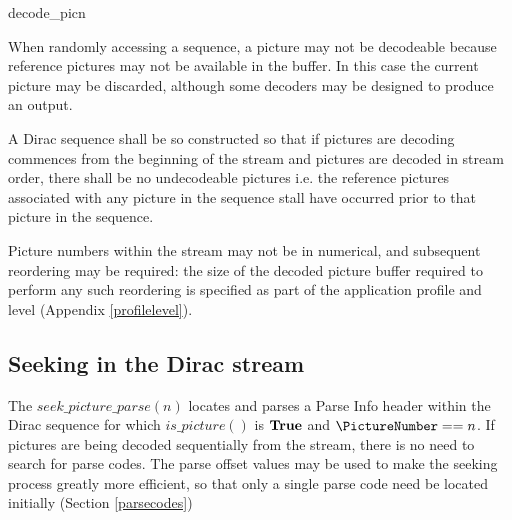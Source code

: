 \begin{pseudo}{decode\_pic}{n}
\bsIF{\ZeroResidual==\false}
\bsEND
{}
    \bsEND
\bsEND
{}
\bsEND
{}
\end{pseudo}

When randomly accessing a sequence, a picture may not be decodeable because reference pictures
may not be available in the buffer. In this case the current picture may be discarded, although some
decoders may be designed to produce an output. 

A Dirac sequence shall be so constructed so that if
pictures are decoding commences from the beginning of the stream and pictures are decoded in 
stream order, there shall be no undecodeable pictures i.e. the reference pictures associated with
any picture in the sequence stall have occurred prior to that picture in the sequence.

Picture numbers within the stream may not be in numerical, and subsequent reordering may be
required: the size of the decoded picture buffer required to perform any such reordering is specified
as part of the application profile and level (Appendix \ref{profilelevel}).

\subsection{Seeking in the Dirac stream}
\label{seeking}

The $seek\_picture\_parse(n)$ locates and parses a Parse Info header within the Dirac sequence for
which $is\_picture()$ is $\text{\bf{True}}$ and $\PictureNumber==n$. If pictures are being decoded sequentially
from the stream, there is no need to search for parse codes. The parse offset values may be used
to make the seeking process greatly more efficient, so that only a single parse code need be located
initially (Section \ref{parsecodes})

